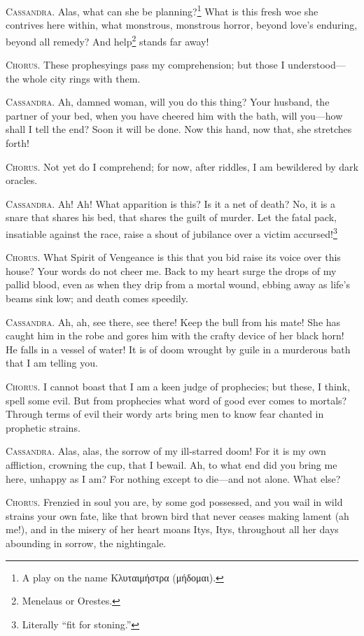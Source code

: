 \documentclass[12pt]{article}
\begin{document}
\textsc{Cassandra.} Alas, what can she be planning?\footnote{A play on the name Κλυταιμήστρα (μήδομαι).} What is this fresh woe she contrives here within, what monstrous, monstrous horror, beyond love's enduring, beyond all remedy? And help\footnote{Menelaus or Orestes.} stands far away!

\textsc{Chorus.} These prophesyings pass my comprehension; but those I understood---the whole city rings with them.

\textsc{Cassandra.} Ah, damned woman, will you do this thing? Your husband, the partner of your bed, when you have cheered him with the bath, will you---how shall I tell the end? Soon it will be done. Now this hand, now that, she stretches forth!

\textsc{Chorus.} Not yet do I comprehend; for now, after riddles, I am bewildered by dark oracles.

\textsc{Cassandra.} Ah! Ah! What apparition is this? Is it a net of death? No, it is a snare that shares his bed, that shares the guilt of murder. Let the fatal pack, insatiable against the race, raise a shout of jubilance over a victim accursed!\footnote{Literally ``fit for stoning.''}

\textsc{Chorus.} What Spirit of Vengeance is this that you bid raise its voice over this house? Your words do not cheer me. Back to my heart surge the drops of my pallid blood, even as when they drip from a mortal wound, ebbing away as life's beams sink low; and death comes speedily.

\textsc{Cassandra.} Ah, ah, see there, see there! Keep the bull from his mate! She has caught him in the robe and gores him with the crafty device of her black horn! He falls in a vessel of water! It is of doom wrought by guile in a murderous bath that I am telling you.

\textsc{Chorus.} I cannot boast that I am a keen judge of prophecies; but these, I think, spell some evil. But from prophecies what word of good ever comes to mortals? Through terms of evil their wordy arts bring men to know fear chanted in prophetic strains.

\textsc{Cassandra.} Alas, alas, the sorrow of my ill-starred doom! For it is my own affliction, crowning the cup, that I bewail. Ah, to what end did you bring me here, unhappy as I am? For nothing except to die---and not alone. What else?

\textsc{Chorus.} Frenzied in soul you are, by some god possessed, and you wail in wild strains your own fate, like that brown bird that never ceases making lament (ah me!), and in the misery of her heart moans Itys, Itys, throughout all her days abounding in sorrow, the nightingale.
\end{document}
